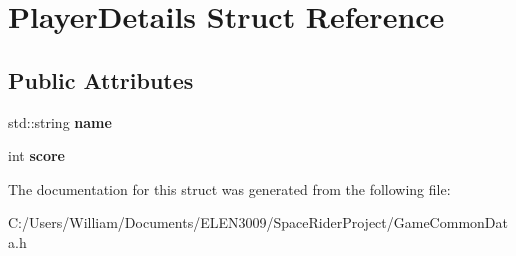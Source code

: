 \hypertarget{struct_player_details}{}\section{Player\+Details Struct Reference}
\label{struct_player_details}
\subsection*{Public Attributes}
\begin{DoxyCompactItemize}
\item 
\mbox{\label{struct_player_details_a3d54d9926c514fc131a2bfbb4c15bb3d}} 
std\+::string {\bfseries name}
\item 
\mbox{\label{struct_player_details_a67da3a3865a29976bfac1c33e5b0bfd8}} 
int {\bfseries score}
\end{DoxyCompactItemize}


The documentation for this struct was generated from the following file\+:\begin{DoxyCompactItemize}
\item 
C\+:/\+Users/\+William/\+Documents/\+E\+L\+E\+N3009/\+Space\+Rider\+Project/Game\+Common\+Data.\+h\end{DoxyCompactItemize}
